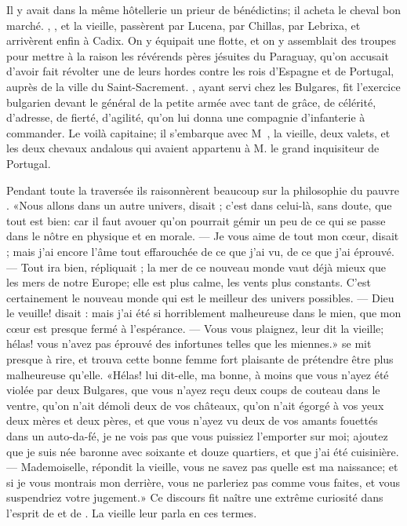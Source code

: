 Il y avait dans la même hôtellerie un prieur de bénédictins; il acheta
le cheval bon marché. , , et la vieille, passèrent par
Lucena, par Chillas, par Lebrixa, et arrivèrent enfin à Cadix. On y
équipait une flotte, et on y assemblait des troupes pour mettre à la
raison les révérends pères jésuites du Paraguay, qu’on accusait d’avoir
fait révolter une de leurs hordes contre les rois d’Espagne et de
Portugal, auprès de la ville du Saint-Sacrement. , ayant
servi chez les Bulgares, fit l’exercice bulgarien devant le général de
la petite armée avec tant de grâce, de célérité, d’adresse, de fierté,
d’agilité, qu’on lui donna une compagnie d’infanterie à commander. Le
voilà capitaine; il s’embarque avec M~, la vieille,
deux valets, et les deux chevaux andalous qui avaient appartenu à M. le
grand inquisiteur de Portugal.

Pendant toute la traversée ils raisonnèrent beaucoup sur la philosophie
du pauvre . «Nous allons dans un autre univers, disait ;
c’est dans celui-là, sans doute, que tout est bien: car il faut avouer
qu’on pourrait gémir un peu de ce qui se passe dans le nôtre en
physique et en morale. — Je vous aime de tout mon cœur, disait
; mais j’ai encore l’âme tout effarouchée de ce que j’ai vu,
de ce que j’ai éprouvé. — Tout ira bien, répliquait ; la mer de ce
nouveau monde vaut déjà mieux que les mers de notre Europe; elle est
plus calme, les vents plus constants. C’est certainement le
nouveau monde qui est le meilleur des univers possibles. — Dieu le
veuille! disait : mais j’ai été si horriblement malheureuse
dans le mien, que mon cœur est presque fermé à l’espérance. — Vous vous
plaignez, leur dit la vieille; hélas! vous n’avez pas éprouvé des
infortunes telles que les miennes.»  se mit presque à rire, et
trouva cette bonne femme fort plaisante de prétendre être plus
malheureuse qu’elle. «Hélas! lui dit-elle, ma bonne, à moins que vous
n’ayez été violée par deux Bulgares, que vous n’ayez reçu deux coups de
couteau dans le ventre, qu’on n’ait démoli deux de vos châteaux, qu’on
n’ait égorgé à vos yeux deux mères et deux pères, et que vous n’ayez vu
deux de vos amants fouettés dans un auto-da-fé, je ne vois pas que vous
puissiez l’emporter sur moi; ajoutez que je suis née baronne avec
soixante et douze quartiers, et que j’ai été cuisinière. — Mademoiselle,
répondit la vieille, vous ne savez pas quelle est ma naissance; et si
je vous montrais mon derrière, vous ne parleriez pas comme vous faites,
et vous suspendriez votre jugement.» Ce discours fit naître une extrême
curiosité dans l’esprit de  et de . La vieille leur
parla en ces termes.\quad\null


